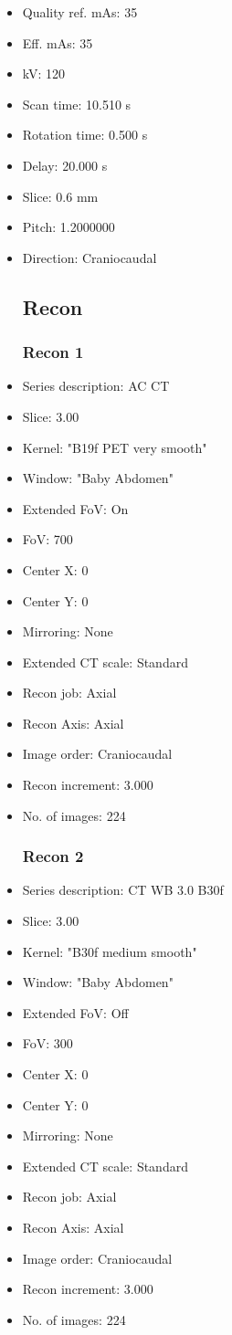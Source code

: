 \documentclass[12pt]{article}
\begin{document}
\begin{itemize}
\subsection{Scan}
\item Quality ref. mAs: 35\item Eff. mAs: 35\item kV: 120\item Scan time: 10.510 s\item Rotation time: 0.500 s\item Delay: 20.000 s\item Slice: 0.6 mm\item Pitch: 1.2000000\item Direction: Craniocaudal
\subsection{Recon}

\subsubsection{Recon 1}
\item Series description: AC CT
\item Slice: 3.00
\item Kernel: "B19f PET very smooth"
\item Window: "Baby Abdomen"
\item Extended FoV: On
\item FoV: 700
\item Center X: 0
\item Center Y: 0
\item Mirroring: None
\item Extended CT scale: Standard
\item Recon job: Axial
\item Recon Axis: Axial
\item Image order: Craniocaudal
\item Recon increment: 3.000
\item No. of images: 224
\subsubsection{Recon 2}
\item Series description: CT WB 3.0 B30f
\item Slice: 3.00
\item Kernel: "B30f medium smooth"
\item Window: "Baby Abdomen"
\item Extended FoV: Off
\item FoV: 300
\item Center X: 0
\item Center Y: 0
\item Mirroring: None
\item Extended CT scale: Standard
\item Recon job: Axial
\item Recon Axis: Axial
\item Image order: Craniocaudal
\item Recon increment: 3.000
\item No. of images: 224

\end{itemize}
\end{document}
